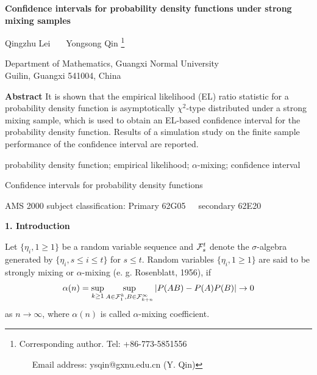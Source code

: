 \documentclass[12pt]{article}
\begin{document}
\begin{center}
 {\bf \large Confidence intervals for probability
density functions under strong mixing samples }
\end{center}

\bigskip

\begin{center}
Qingzhu Lei \ \ \  Yongsong Qin
\footnote{Corresponding author. Tel: +86-773-5851556

\ \ \  Email address: ysqin@gxnu.edu.cn (Y. Qin)}
\bigskip


{\small  Department of Mathematics, Guangxi Normal University\\
Guilin, Guangxi 541004, China}
\bigskip
\end{center}



 \noindent
{\bf Abstract }  It is shown that the empirical likelihood (EL) ratio statistic for a probability density function is asymptotically
$\chi^2$-type distributed under a strong mixing sample, which is used to obtain an EL-based confidence interval for the  probability density function.
Results of a simulation study on the finite sample performance of the confidence
interval are reported.


  probability density function;
empirical likelihood; $\alpha$-mixing; confidence interval


 Confidence intervals for probability density functions

\noindent AMS 2000 subject classification: Primary 62G05\ \ \  secondary
62E20


\newpage

\setcounter{section}{1}
\setcounter{equation}{0}

 \noindent
{\bf 1. Introduction}
\bigskip

Let $\{\eta_i, 1\geq 1\}$ be a random variable sequence and
${\cal{F}}^t_s$ denote the $\sigma$-algebra generated by $\{\eta_i,
s\leq i\leq t\}$ for $s\leq t$.  Random variables $\{\eta_i, 1\geq
1\}$ are said to be strongly mixing or $\alpha$-mixing (e. g. Rosenblatt, 1956), if
\[
\alpha(n)=\sup_{k\geq 1}\sup_{ A\in {\cal{F}}^k_1 , B\in
{\cal{F}}^{\infty}_{k+n}}|P(AB)-P(A)P(B)| \to 0
\]
as $n\to \infty$, where $\alpha(n)$ is called $\alpha$-mixing coefficient.
\end{document}
